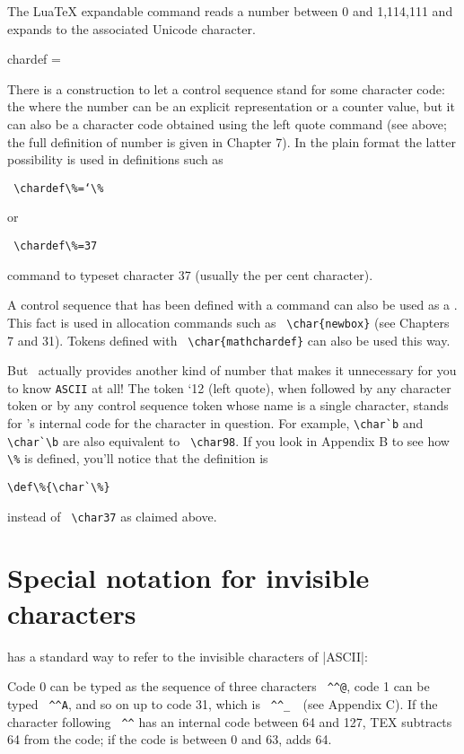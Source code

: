 \CMDI{\Uchar} The LuaTeX expandable command \cmd{\Uchar} reads a number between 0 and 1,114,111 and expands to the associated Unicode character. 

\begin{docCommand*}{chardef} {=}

There is a construction to let a control sequence stand for some character code: the \cmd{\chardef}
where the number can be an explicit representation or a counter value, but it can also be a character
code obtained using the left quote command (see above; the full definition of number is
given in Chapter 7). In the plain format the latter possibility is used in definitions such as
\end{docCommand*}

\verb+ \chardef\%=‘\%+

or 

\verb+ \chardef\%=37   +

command to typeset character 37 (usually the per cent character).

A control sequence that has been defined with a \cmd{\chardef} command can also be used as a .
This fact is used in allocation commands such as \verb+ \char{newbox}+ (see Chapters 7 and 31). Tokens defined
with \verb+ \char{mathchardef}+ can also be used this way.


But \tex\ actually provides another kind of number that makes it unnecessary
for you to know \texttt{ASCII} at all! The token `12 (left quote), when followed by
any character token or by any control sequence token whose name is a single character,
stands for \tex's internal code for the character in question. For example, \verb+\char`b+ and
\verb+ \char`\b+ are also equivalent to \verb+ \char98+. If you look in Appendix B to see how \verb+ \%+ is
defined, you'll notice that the definition is

\verb+\def\%{\char`\%}+

instead of \verb+ \char37+  as claimed above.

\section{Special notation for invisible characters}

\tex has a standard way to refer to the invisible characters of |ASCII|: 

Code 0 can be typed as the sequence of three characters \verb+ ^^@+, code 1 can be typed
\verb+ ^^A+, and so on up to code 31, which is \verb+ ^^_  +(see Appendix C). If the character following
\verb+ ^^+ has an internal code between 64 and 127, TEX subtracts 64 from the code; if the
code is between 0 and 63, \tex adds 64. 

